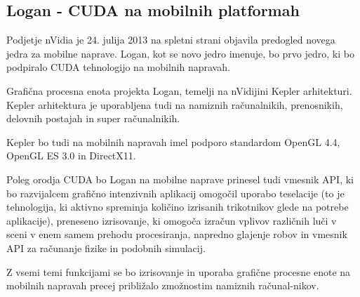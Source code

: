 \subsection{Logan - CUDA na mobilnih platformah}




Podjetje nVidia je 24. julija 2013 \cite{cuda-mobile} na spletni strani objavila predogled novega jedra za mobilne naprave. Logan, kot se novo jedro imenuje, bo prvo jedro, ki bo podpiralo CUDA tehnologijo na mobilnih napravah.

Grafična procesna enota projekta Logan, temelji na nVidijini Kepler arhitekturi. Kepler arhitektura je uporabljena tudi na namiznih računalnikih, prenosnikih, delovnih postajah in super računalnikih.

Kepler bo tudi na mobilnih napravah imel podporo standardom OpenGL 4.4, OpenGL ES 3.0 in DirectX11.

Poleg orodja CUDA bo Logan na mobilne naprave prinesel tudi vmesnik API, ki bo razvijalcem grafično intenzivnih aplikacij omogočil uporabo teselacije (to je tehnologija, ki aktivno spreminja količino izrisanih trikotnikov glede na potrebe aplikacije), preneseno izrisovanje, ki omogoča izračun vplivov različnih luči v sceni v enem samem prehodu procesiranja, napredno glajenje robov in vmesnik API za računanje fizike in podobnih simulacij.

Z vsemi temi funkcijami se bo izrisovanje in uporaba grafične procesne enote na mobilnih napravah precej približalo zmožnostim namiznih računal-nikov. 
 


